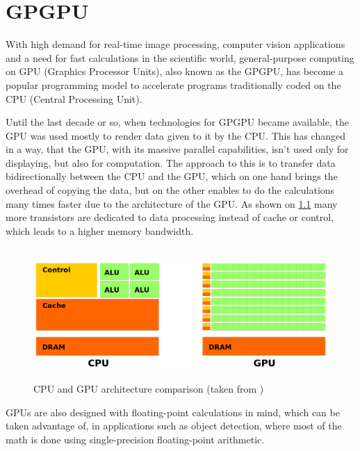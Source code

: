 
\chapter{GPGPU}

With high demand for real-time image processing, computer vision applications and a need for fast calculations in the scientific world, general-purpose computing on GPU (Graphics Processor Units), also known as the GPGPU, has become a popular programming model to accelerate programs traditionally coded on the CPU (Central Processing Unit).

Until the last decade or so, when technologies for GPGPU became available, the GPU was used mostly to render data given to it by the CPU. This has changed in a way, that the GPU, with its massive parallel capabilities, isn't used only for displaying, but also for computation. The approach to this is to transfer data bidirectionally between the CPU and the GPU, which on one hand brings the overhead of copying the data, but on the other enables to do the calculations many times faster due to the architecture of the GPU. As shown on \ref{fig:cpu-gpu} many more transistors are dedicated to data processing instead of cache or control, which leads to a higher memory bandwidth.

\begin{center}
\begin{figure}[h]
	\centering\includegraphics[height=5cm]{fig/cpu-gpu.png}
	\caption{CPU and GPU architecture comparison (taken from \cite{cuda-toolkit-docs})}
	\label{fig:cpu-gpu}
\end{figure}
\end{center}

GPUs are also designed with floating-point calculations in mind, which can be taken advantage of, in applications such as object detection, where most of the math is done using single-precision floating-point arithmetic.

